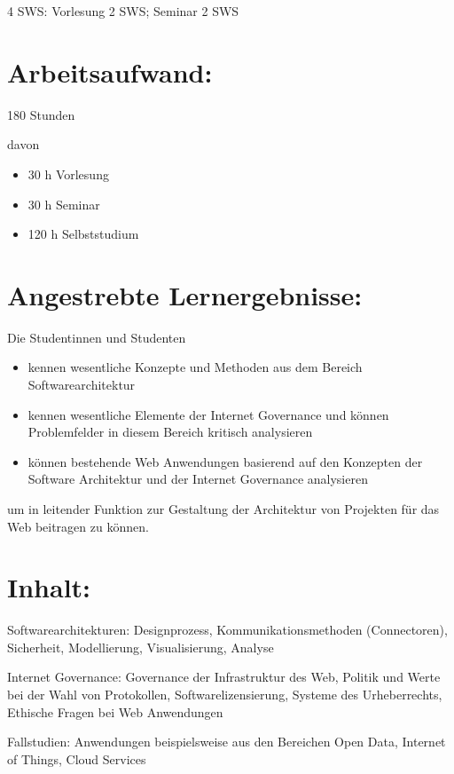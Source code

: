 4 SWS: Vorlesung 2 SWS; Seminar 2 SWS

\section*{Arbeitsaufwand:}\label{arbeitsaufwand-28}

180 Stunden

davon

\begin{itemize}
\tightlist
\item
  30 h Vorlesung
\item
  30 h Seminar
\item
  120 h Selbststudium
\end{itemize}

\section*{Angestrebte
Lernergebnisse:}\label{angestrebte-lernergebnisse-22}

Die Studentinnen und Studenten

\begin{itemize}
\tightlist
\item
  kennen wesentliche Konzepte und Methoden aus dem Bereich
  Softwarearchitektur
\item
  kennen wesentliche Elemente der Internet Governance und können
  Problemfelder in diesem Bereich kritisch analysieren
\item
  können bestehende Web Anwendungen basierend auf den Konzepten der
  Software Architektur und der Internet Governance analysieren
\end{itemize}

um in leitender Funktion zur Gestaltung der Architektur von Projekten
für das Web beitragen zu können.

\section*{Inhalt:}\label{inhalt-22}

Softwarearchitekturen: Designprozess, Kommunikationsmethoden
(Connectoren), Sicherheit, Modellierung, Visualisierung, Analyse

Internet Governance: Governance der Infrastruktur des Web, Politik und
Werte bei der Wahl von Protokollen, Softwarelizensierung, Systeme des
Urheberrechts, Ethische Fragen bei Web Anwendungen

Fallstudien: Anwendungen beispielsweise aus den Bereichen Open Data,
Internet of Things, Cloud Services

